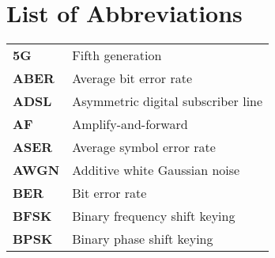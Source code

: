 \chapter*{List of Abbreviations}
\begin{longtable}[l]{>{\bfseries}ll} 
5G & Fifth generation\\
ABER & Average bit error rate\\
ADSL & Asymmetric digital subscriber line\\
AF & Amplify-and-forward \\
ASER &  Average symbol error rate\\
AWGN &   Additive white Gaussian noise\\
BER & Bit error rate\\
BFSK & Binary frequency shift keying \\
BPSK & Binary phase shift keying \\




\end{longtable}

